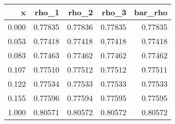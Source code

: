 \begin{tabular}{rrrrr}
\toprule
    x &   rho\_1 &   rho\_2 &   rho\_3 &  bar\_rho \\
\midrule
0.000 & 0.77835 & 0.77836 & 0.77835 &  0.77835 \\
0.053 & 0.77418 & 0.77418 & 0.77418 &  0.77418 \\
0.083 & 0.77463 & 0.77462 & 0.77462 &  0.77462 \\
0.107 & 0.77510 & 0.77512 & 0.77512 &  0.77511 \\
0.122 & 0.77534 & 0.77533 & 0.77533 &  0.77533 \\
0.155 & 0.77596 & 0.77594 & 0.77595 &  0.77595 \\
1.000 & 0.80571 & 0.80572 & 0.80572 &  0.80572 \\
\bottomrule
\end{tabular}
